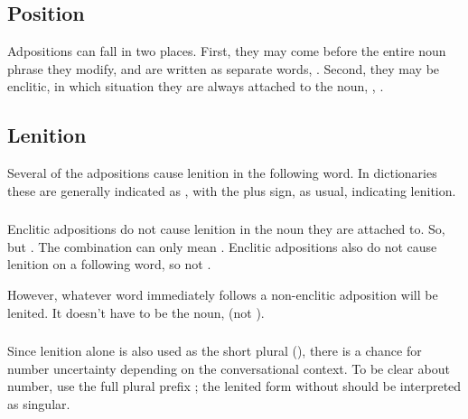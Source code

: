 \subsection{Position} Adpositions can fall in two places.  First,
they may come before the entire noun phrase they modify, and are
written as separate words, 
  .  Second, they may
be enclitic, in which situation they are always attached to the noun,
 ,
   .
\label{syn:adp:position}

\subsection{Lenition} Several of the adpositions
cause lenition in the following word.  In dictionaries these are
generally indicated as , with the plus sign, as usual,
indicating lenition.

\subsubsection{} Enclitic adpositions do not cause lenition in the
noun they are attached to.  So,   but
.  The combination  can only mean .  Enclitic adpositions also do not cause lenition on a
following word, so  
not .

However, whatever word immediately follows a non-enclitic adposition
will be lenited.  It doesn't have to be the noun, 
 (not ).

\subsubsection{} Since lenition alone is also used as the short plural
(), there is a chance for number
uncertainty depending on the conversational context.  To be clear
about number, use the full plural prefix ; the lenited form
without  should be interpreted as singular.
\label{syn:adp:short-plural}


